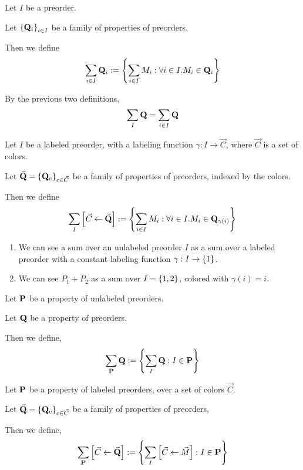 \begin{definition}
  Let $I$ be a preorder.

  Let $\left\{ {\mathbf{Q}_i} \right\}_{i \in I}$ be a family of properties of preorders.

  Then we define
  \[
    \sum_{i \in I}{\mathbf{Q}_i} := \left\{ {\sum_{i \in I}{M_i} : \forall i \in I. M_i \in \mathbf{Q}_i} \right\}
  \]
\end{definition}

\begin{note}
  By the previous two definitions,
  \[
    \sum_{I}{\mathbf{Q}} = \sum_{i \in I}{\mathbf{Q}}
  \]
\end{note}

\begin{definition}
  Let $I$ be a labeled preorder, with a labeling function $\gamma : I \to \vec{C}$,
  where $\vec{C}$ is a set of colors.

  Let $\vec{\mathbf{Q}} = \left\{ {\mathbf{Q}_c} \right\}_{c \in \vec{C}}$ be a family of properties of preorders,
  indexed by the colors.

  Then we define
  \[
    \sum_{I} \left[ {{\vec{C}} \leftarrow {\vec{\mathbf{Q}}}} \right] := \left\{ {\sum_{i \in I}{M_i} : \forall i \in I. M_i \in \mathbf{Q}_{\gamma(i)}} \right\}
  \]
\end{definition}

\begin{notes}
  \begin{enumerate}
    \item We can see a sum over an unlabeled preorder $I$ as a sum over a labeled preorder
          with a constant labeling function $\gamma : I \to \left\{ {1} \right\}$.
    \item We can see $P_1 + P_2$ as a sum over $I = \left\{ {1, 2} \right\}$, colored
          with $\gamma(i) = i$.
  \end{enumerate}
\end{notes}

\begin{definition}
  Let $\mathbf{P}$ be a property of unlabeled preorders.

  Let $\mathbf{Q}$ be a property of preorders.

  Then we define,
  \[
    \sum_{\mathbf{P}}{\mathbf{Q}} := \left\{ {\sum_{I}{\mathbf{Q}} : I \in \mathbf{P}} \right\}
  \]
\end{definition}

\begin{definition}
  Let $\mathbf{P}$ be a property of labeled preorders, over a set of colors $\vec{C}$.

  Let $\vec{\mathbf{Q}} = \left\{ {\mathbf{Q}_c} \right\}_{c \in \vec{C}}$ be a family of properties of preorders,

  Then we define,
  \[
    \sum_{\mathbf{P}} \left[ {{\vec{C}} \leftarrow {\vec{\mathbf{Q}}}} \right] := \left\{ {\sum_{I} \left[ {{\vec{C}} \leftarrow {\vec{M}}} \right] : I \in \mathbf{P}} \right\}
  \]
\end{definition}